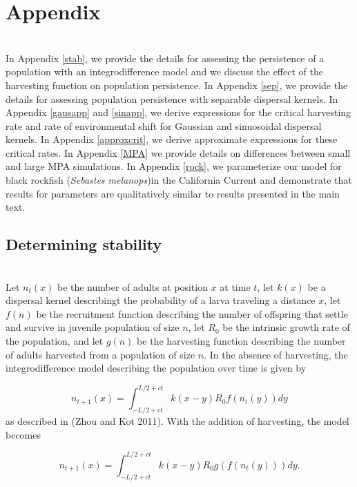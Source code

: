 \documentclass[12pt,english]{article}
\begin{document}
\renewcommand{\thefigure}{A\arabic{figure}}
 \renewcommand{\thetable}{A\arabic{table}}
 \renewcommand{\thesubsection}{\Alph{subsection}}

\section*{Appendix}
~\\In Appendix \ref{stab}, we provide the details for assessing the persistence of a population with an integrodifference model and we discuss the effect of the harvesting function on population persistence.  In Appendix \ref{sep}, we provide the details for assessing population persistence with separable dispersal kernels.  In Appendix \ref{gausapp} and \ref{sinapp}, we derive expressions for the critical harvesting rate and rate of environmental shift for Gaussian and sinuosoidal dispersal kernels.  In Appendix \ref{approxcrit}, we derive approximate expressions for these critical rates. In Appendix \ref{MPA} we provide details on differences between small and large MPA simulations. In Appendix \ref{rock}, we parameterize our model for black rockfish (\emph{Sebastes melanops})in the California Current and demonstrate that results for  parameters  are qualitatively similar to results  presented in the main text. 


\subsection{Determining stability \label{stab}}
~\\Let $n_t(x)$ be the number of adults at position $x$ at time $t$, let $k(x)$ be a dispersal kernel describingt the probability of a larva traveling a distance $x$, let $f(n)$ be the recruitment function describing the number of offspring that settle and survive in juvenile population of size $n$, let $R_0$ be the intrinsic growth rate of the population, and let $g(n)$ be the harvesting function describing the number of adults harvested from a population of size $n$.  In the absence of harvesting, the integrodifference model describing the population over time is given by 

\begin{equation} n_{t+1}(x)=\int_{-L/2+ct}^{L/2+ct}k(x-y)R_0f(n_t(y))dy \label{integro} \end{equation}
as described in (Zhou and Kot 2011).  With the addition of harvesting, the model becomes

\begin{equation} n_{t+1}(x)=\int_{-L/2+ct}^{L/2+ct}k(x-y)R_0g(f(n_t(y)))dy. \label{integro} \end{equation}
\end{document}
